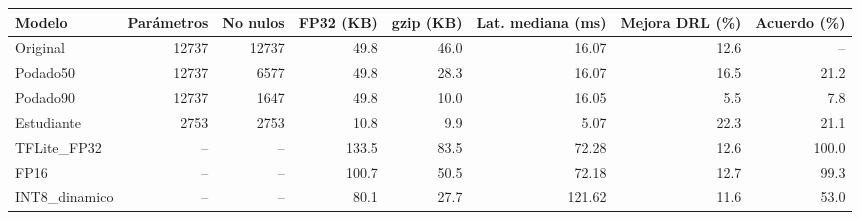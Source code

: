 \begin{tabular}{lrrrrrrr}
\toprule
Modelo & Par\'ametros & No nulos & FP32 (KB) & gzip (KB) & Lat. mediana (ms) & Mejora DRL (\%) & Acuerdo (\%) \\
\midrule
Original & 12737 & 12737 & 49.8 & 46.0 & 16.07 & 12.6 & -- \\
Podado50 & 12737 & 6577 & 49.8 & 28.3 & 16.07 & 16.5 & 21.2 \\
Podado90 & 12737 & 1647 & 49.8 & 10.0 & 16.05 & 5.5 & 7.8 \\
Estudiante & 2753 & 2753 & 10.8 & 9.9 & 5.07 & 22.3 & 21.1 \\
TFLite_FP32 & -- & -- & 133.5 & 83.5 & 72.28 & 12.6 & 100.0 \\
FP16 & -- & -- & 100.7 & 50.5 & 72.18 & 12.7 & 99.3 \\
INT8_dinamico & -- & -- & 80.1 & 27.7 & 121.62 & 11.6 & 53.0 \\
\bottomrule
\end{tabular}